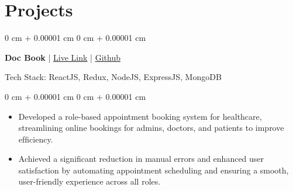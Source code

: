 \documentclass[12pt, a3paper]{article}
\newenvironment{highlights}{
    \begin{itemize}[
        topsep=0.10 cm,
        parsep=0.10 cm,
        partopsep=0pt,
        itemsep=0pt,
        leftmargin=0 cm + 10pt
    ]
}{
    \end{itemize}
} %
\newenvironment{onecolentry}{
    \begin{adjustwidth}{
        0 cm + 0.00001 cm
    }{
        0 cm + 0.00001 cm
    }
}{
    \end{adjustwidth}
} %
\newenvironment{twocolentry}[2][]{
    \onecolentry
    \def\secondColumn{#2}
    \setcolumnwidth{\fill, 4.5 cm}
    \begin{paracol}{2}
}{
    \switchcolumn \raggedleft \secondColumn
    \end{paracol}
    \endonecolentry
} %
\begin{document}
        


    \vspace{0.7 cm}

    
    \section{Projects}



        
        \begin{twocolentry}{
            
        }
            \textbf{Doc Book } | \href{https://netlify.app/}{Live Link} | \href{https://github.com/trishaamandal/Doc-BOOK}{Github}\end{twocolentry}
            Tech Stack: ReactJS, Redux, NodeJS, ExpressJS, MongoDB

        \vspace{0.10 cm}
        \begin{onecolentry}
            \begin{highlights}
                \item Developed a role-based appointment booking system for
                healthcare, streamlining online bookings for admins,
                doctors, and patients to improve efﬁciency.
                \item Achieved a signiﬁcant reduction in manual errors and
                enhanced user satisfaction by automating appointment
                scheduling and ensuring a smooth, user-friendly
                experience across all roles.
            \end{highlights}
        \end{onecolentry}
\end{document}

